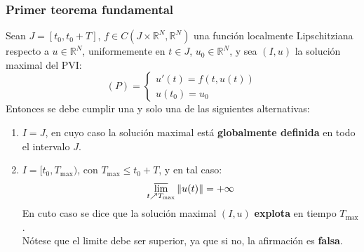 \subsubsection{Primer teorema fundamental}

\begin{teorema}
    Sean $J = [t_0, t_0 + T]$, $f \in C(J \times \mathbb{R}^N, \mathbb{R}^N)$ una función localmente Lipschitziana respecto a $u \in \mathbb{R}^N$, uniformemente en $t \in J$, $u_0 \in \mathbb{R}^N$, y sea $(I, u)$ la solución maximal del PVI:
    \[
        (P) =
        \begin{cases}
            u'(t) = f(t, u(t)) \\
            u(t_0) = u_0
        \end{cases}
    \]
    Entonces se debe cumplir una y solo una de las siguientes alternativas:
    \begin{enumerate}
        \item $I=J$, en cuyo caso la solución maximal está \textbf{globalmente definida} en todo el intervalo $J$.
        \item $I = [t_0, T_{\text{max}})$, con $T_{\text{max}} \leq t_0 + T$, y en tal caso:
        \[
            \varlimsup_{t \nearrow T_{\text{max}}} \| u(t) \| = +\infty
        \]
        En cuto caso se dice que la solución maximal $(I, u)$ \textbf{explota} en tiempo $T_{\text{max}}$.\\
        Nótese que el limite debe ser superior, ya que si no, la afirmación es \textbf{falsa}.
    \end{enumerate}
\end{teorema}

